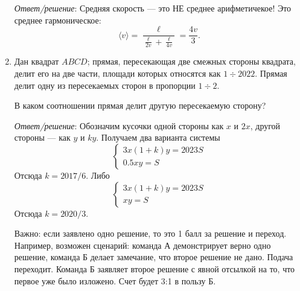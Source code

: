 \documentclass[12pt]{article} %
\begin{document}
\begin{enumerate}
\textsl{Ответ/решение}: Средняя скорость — это НЕ среднее арифметичекое! 
Это среднее гармоническое: 
\[
  \langle v \rangle = \frac{\ell}{\frac{\ell}{2v}+\frac{\ell}{4v}} = \frac{4v}{3}.
\]



\item  Дан квадрат $ABCD$; прямая, пересекающая две смежных стороны квадрата, делит его на две части, площади которых относятся как $1\div 2022$.
Прямая делит одну из пересекаемых сторон в пропорции $1\div 2$. 

В каком соотношении прямая делит другую пересекаемую сторону?

\textsl{Ответ/решение}: Обозначим кусочки одной стороны как $x$ и $2x$, другой стороны — как $y$ и $ky$. 
Получаем два варианта системы
\[
\begin{cases}
3x(1+k)y=2023S \\
0.5xy=S
\end{cases}
\]  
Отсюда $k=2017/6$.
Либо
\[
\begin{cases}
3x(1+k)y=2023S \\
xy=S
\end{cases}
\]  
Отсюда $k=2020/3$.

Важно: если заявлено одно решение, то это 1 балл за решение и переход. 
Например, возможен сценарий: команда А демонстрирует верно одно решение, команда Б делает замечание, что второе решение не дано.
Подача переходит. Команда Б заявляет второе решение с явной отсылкой на то, что первое уже было изложено. Счет будет 3:1 в пользу Б. 

\end{enumerate}
\end{document}
